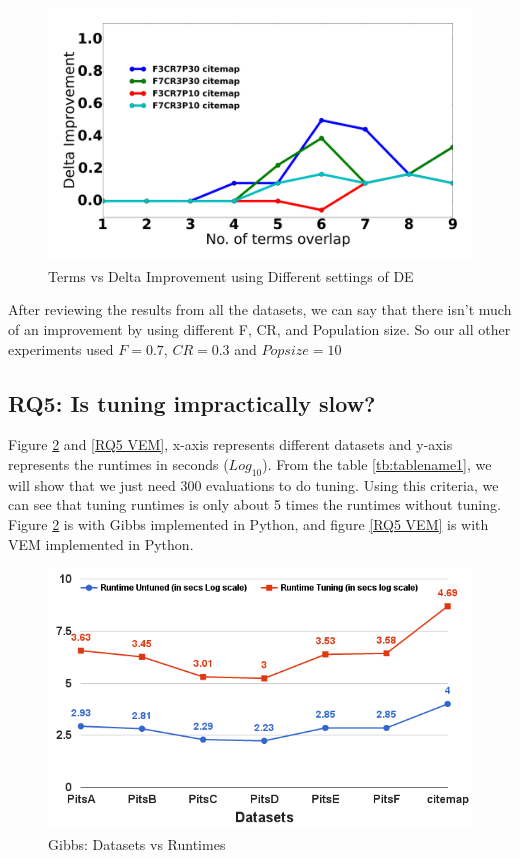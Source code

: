 \documentclass[conference]{IEEEtran}
\theoremstyle{break}
\begin{document}
\begin{figure}[!htb]
  \includegraphics[width=\linewidth]{./fig/citemap.png}
  \caption{Terms vs Delta Improvement using Different settings of DE}
  \label{fig:RQ4}
\end{figure}

After reviewing the results from all the datasets, we can say that there isn't much of an improvement by using different F, CR, and Population size. So our all other experiments used $F=0.7$, $CR=0.3$ and $Pop size = 10$

\subsection{\textbf{RQ5: Is tuning impractically slow?}}

Figure \ref{RQ5 Gibbs} and \ref{RQ5 VEM}, x-axis represents different datasets and y-axis represents the runtimes in seconds ($Log_{10}$). From the table \ref{tb:tablename1}, we will show that we just need 300 evaluations to do tuning. Using this criteria, we can see that tuning runtimes is only about 5 times the runtimes without tuning. Figure \ref{RQ5 Gibbs} is with Gibbs implemented in Python, and figure \ref{RQ5 VEM} is with VEM implemented in Python.

\begin{center}
\begin{figure}[!h]
  \includegraphics[width=\linewidth]{./fig/Run_gibbs_sci.png}
  \caption{Gibbs: Datasets vs Runtimes}
  \label{RQ5 Gibbs}
\end{figure}
\end{center}
\end{document}
